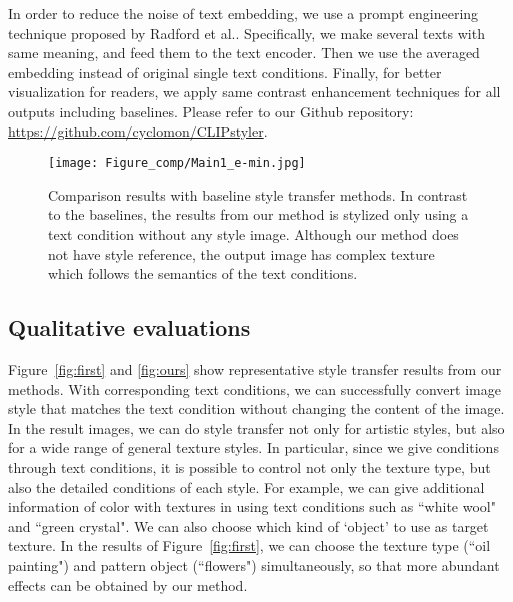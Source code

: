 \documentclass[10pt,twocolumn,letterpaper]{article}
\begin{document}
In order to reduce the noise of text embedding, we use a prompt engineering technique  proposed by Radford et al.\cite{clip}. Specifically,
we make several texts with same meaning, and feed them to the text encoder. Then we use the averaged embedding instead of original single text conditions. {Finally, for better visualization for readers,  we apply same contrast enhancement techniques for all outputs including baselines.} Please refer to our Github repository: \href{https://github.com/cyclomon/CLIPstyler}{https://github.com/cyclomon/CLIPstyler}.

\begin{figure*}[t]
\vspace*{-0.5cm}
\centering
\texttt{[image: Figure\_comp/Main1\_e-min.jpg]}
\vspace*{-0.4cm}
\caption{Comparison results with baseline style transfer methods.  In contrast to the baselines, the results from our method is stylized only using a text condition without any style image. Although our method does not have style reference, the output image has complex texture which follows the semantics of the text conditions.
}
\label{fig:comp}
\end{figure*}

\subsection{Qualitative evaluations}
Figure~\ref{fig:first} and \ref{fig:ours} show representative style transfer results from our methods. With corresponding text conditions, we can successfully
convert image style that matches the text condition without changing the content of the image. %
In the result images, we can do style transfer not only for artistic styles, but also for a wide range of general texture styles. In particular, since we give conditions through text conditions, it is possible to control not only the texture type, but also the detailed conditions of each style. For example, we can give additional information of color with textures in using text conditions such as ``white wool" and ``green crystal". We can also choose which kind of `object' to use as target texture. In the results of Figure~\ref{fig:first}, we can choose the texture type (``oil painting") and pattern object (``flowers") simultaneously, so that more abundant effects can be obtained by our method.
\end{document}
